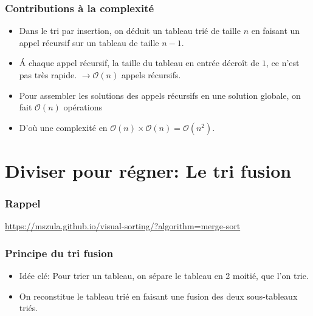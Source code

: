 \documentclass[aspectratio=169]{beamer}
\begin{document}
\begin{frame}
  \frametitle{Contributions à la complexité}

  \begin{itemize}
  \item Dans le tri par insertion, on déduit un tableau trié de taille \(n\) en
    faisant un appel récursif sur un tableau de taille \(n-1\).
  \item \'A chaque appel récursif, la taille du tableau en entrée décroît de
    \(1\), ce n'est pas très rapide. \(\to \mathcal{O}(n)\) appels récursifs.
  \item Pour assembler les solutions des appels récursifs en une solution
    globale, on fait \(\mathcal{O}(n)\) opérations
  \item D'où une complexité en
    \(\mathcal{O}(n) \times \mathcal{O}(n) = \mathcal{O}(n^{2})\).
  \end{itemize}

\end{frame}


\section{Diviser pour régner: Le tri fusion}

\begin{frame}
  \frametitle{Rappel}
  \alert{\url{https://mszula.github.io/visual-sorting/?algorithm=merge-sort}}
\end{frame}

\begin{frame}
  \frametitle{Principe du tri fusion}

  \begin{itemize}
  \item Idée clé: Pour trier un tableau, on sépare le tableau en 2 moitié, que
    l'on trie.
  \item On reconstitue le tableau trié en faisant une fusion des deux
    sous-tableaux triés.
  \end{itemize}
\end{frame}
\end{document}

